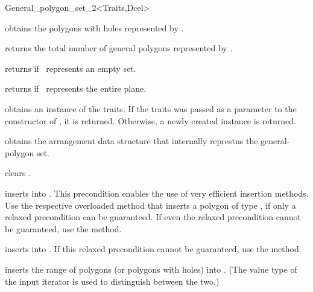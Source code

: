 \begin{ccRefClass}{General_polygon_set_2<Traits,Dcel>}
\ccAccessFunctions
\ccThreeToTwo

  {obtains the polygons with holes represented by \ccVar.}
  
  {returns the total number of general polygons represented by \ccVar.}

  {returns  if \ccVar\ represents an empty set.}

  {returns  if \ccVar\ represents the entire plane.}

  {obtains an instance of the traits. If the traits was passed as a
  parameter to the constructor of \ccVar, it is returned. Otherwise, a
  newly created instance is returned.}

  {obtains the arrangement data structure that internally represtns the
  general-polygon set.}

\ccModifiers
\ccThreeToTwo

  {clears \ccVar.}

  {inserts  into \ccVar.
   This precondition enables the use of very efficient insertion methods.
   Use the respective overloaded method that inserts a polygon of type 
   , if only a relaxed precondition can be
   guaranteed. If even the relaxed precondition cannot be guaranteed, use
   the  method.}

  {inserts  into \ccVar.
   If this relaxed precondition cannot be guaranteed, use the  
   method.}

  {inserts the range of polygons (or polygons with holes) into \ccVar. (The
   value type of the input iterator is used to distinguish between the two.)
   }


\end{ccRefClass}
